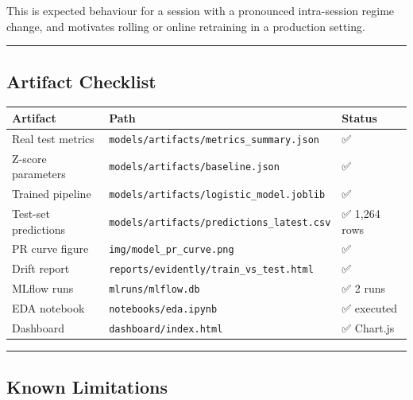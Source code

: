 \documentclass[
]{article}
\begin{document}
This is expected behaviour for a session with a pronounced intra-session
regime change, and motivates rolling or online retraining in a
production setting.

\begin{center}\rule{0.5\linewidth}{0.5pt}\end{center}

\hypertarget{artifact-checklist}{%
\subsection{Artifact Checklist}\label{artifact-checklist}}

\begin{longtable}[]{@{}lll@{}}
\toprule
Artifact & Path & Status \\
\midrule
\endhead
Real test metrics & \texttt{models/artifacts/metrics\_summary.json} &
✅ \\
Z-score parameters & \texttt{models/artifacts/baseline.json} & ✅ \\
Trained pipeline & \texttt{models/artifacts/logistic\_model.joblib} &
✅ \\
Test-set predictions & \texttt{models/artifacts/predictions\_latest.csv}
& ✅ 1,264 rows \\
PR curve figure & \texttt{img/model\_pr\_curve.png} & ✅ \\
Drift report & \texttt{reports/evidently/train\_vs\_test.html} & ✅ \\
MLflow runs & \texttt{mlruns/mlflow.db} & ✅ 2 runs \\
EDA notebook & \texttt{notebooks/eda.ipynb} & ✅ executed \\
Dashboard & \texttt{dashboard/index.html} & ✅ Chart.js \\
\bottomrule
\end{longtable}

\begin{center}\rule{0.5\linewidth}{0.5pt}\end{center}

\hypertarget{known-limitations}{%
\subsection{Known Limitations}\label{known-limitations}}
\end{document}
